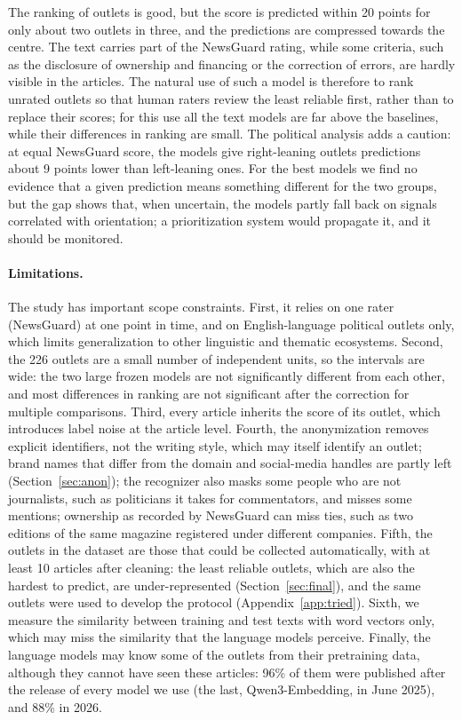 \documentclass[11pt,a4paper]{article}
\begin{document}
The ranking of outlets is good, but the score is predicted within 20 points for only about two outlets in three, and
the predictions are compressed towards the centre. The text carries part of the NewsGuard rating, while some criteria,
such as the disclosure of ownership and financing or the correction of errors, are hardly visible in the articles. The
natural use of such a model is therefore to rank unrated outlets so that human raters review the least reliable first,
rather than to replace their scores; for this use all the text models are far above the baselines, while their
differences in ranking are small. The political analysis adds a caution: at equal NewsGuard score, the models give
right-leaning outlets predictions about 9 points lower than left-leaning ones. For the best models we find no evidence that a given prediction means something different for the two groups, but the
gap shows that, when uncertain, the models partly fall back on signals correlated with orientation; a prioritization
system would propagate it, and it should be monitored.

\paragraph{Limitations.}
The study has important scope constraints. First, it relies on one rater (NewsGuard) at one point in time, and on
English-language political outlets only, which limits generalization to other linguistic and thematic ecosystems.
Second, the 226 outlets are a small number of independent units, so the intervals are wide: the two large frozen models
are not significantly different from each other, and most differences in ranking are not significant after the
correction for multiple comparisons. Third, every article inherits the score of its outlet, which introduces label noise
at the article level. Fourth, the anonymization removes explicit identifiers, not the writing style, which may itself identify an outlet; brand names that differ from the domain and social-media handles
are partly left (Section~\ref{sec:anon}); the recognizer also masks some people who are not journalists, such as politicians it takes for
commentators, and misses some mentions; ownership as recorded by NewsGuard can miss ties, such as two editions of the
same magazine registered under different companies. Fifth, the outlets in the dataset are those that could be collected
automatically, with at least 10 articles after cleaning: the least reliable outlets, which are also the hardest to
predict, are under-represented (Section~\ref{sec:final}), and the same outlets were used to develop the protocol (Appendix~\ref{app:tried}). Sixth, we measure the similarity between training and test
texts with word vectors only, which may miss the similarity that the language models perceive. Finally, the language
models may know some of the outlets from their pretraining data, although they cannot have seen these articles: 96\%
of them were published after the release of every model we use (the last, Qwen3-Embedding, in June 2025), and 88\% in
2026.
\end{document}
